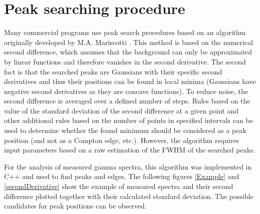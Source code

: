 \section{Peak searching procedure}
\label{search}
Many commercial programs use peak search procedures based on an algorithm originally developed by M.A. Mariscotti \cite{MARISCOTTI1967309}. This method is based on the numerical second difference, which assumes that the background can only be approximated by linear functions and therefore vanishes in the second derivative. The second fact is that the searched peaks are Gaussians with their specific second derivatives and thus their positions can be found in local minima (Gaussians have negative second derivatives as they are concave functions). To reduce noise, the second difference is averaged over a defined number of steps. Rules based on the value of the standard deviation of the second difference at a given point and other additional rules based on the number of points in specified intervals can be used to determine whether the found minimum should be considered as a peak position (and not as a Compton edge, etc.). However, the algorithm requires input parameters based on a raw estimation of the FWHM of the searched peaks.
\par
For the analysis of measured gamma spectra, this algorithm was implemented in C++ and used to find peaks and edges. The following figures \ref{Example} and \ref{secondDerivative} show the example of measured spectra and their second difference plotted together with their calculated standard deviation. The possible candidates for peak positions can be observed.



